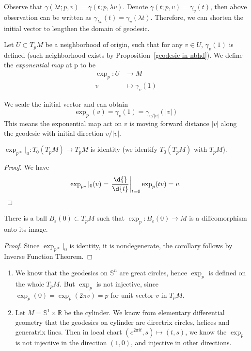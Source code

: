 Observe that $\gamma(\lambda t;p,v)=\gamma(t;p,\lambda v)$.
Denote $\gamma(t;p,v)=\gamma_v(t)$, then above observation can be written as $\gamma_{\lambda v}(t)=\gamma_v(\lambda t)$.
Therefore, we can shorten the initial vector to lengthen the domain of geodesic.

\begin{defn}
    Let $U\subset T_pM$ be a neighborhood of origin, such that for any $v\in U$, $\gamma_v(1)$ is defined (such neighborhood exists by Proposition~\ref{geodesic in nbhd}).
    We define the \emph{exponential map} at p to be
    \begin{align*}
        \exp_p:U&\to M\\
        v&\mapsto\gamma_v(1)
    \end{align*}
\end{defn}

\begin{rem}
    We scale the initial vector and can obtain
    \[\exp_p(v)=\gamma_v(1)=\gamma_{v/|v|}(|v|)\]
    This means the exponential map act on $v$ is moving forward distance $|v|$ along the geodesic with initial direction $v/|v|$.
\end{rem}

\begin{prop}
    $\exp_{p*}|_0:T_0(T_pM)\to T_pM$ is identity (we identify $T_0(T_pM)$ with $T_pM$).
\end{prop}
\begin{proof}
    We have
    \[\exp_{p*}|_0(v)=\left.\frac{\d{}}{\d{t}}\right|_{t=0}\exp_p(tv)=v.\qedhere\]
\end{proof}

\begin{cor}
    There is a ball $B_\varepsilon(0)\subset T_pM$ such that $\exp_p:B_\varepsilon(0)\to M$ is a diffeomorphism onto its image.
\end{cor}
\begin{proof}
    Since $\exp_{p*}|_0$ is identity, it is nondegenerate, the corollary follows by Inverse Function Theorem.
\end{proof}

\begin{eg}
    \begin{enumerate}[(1)]
        \item We know that the geodesics on $\mathbb{S}^n$ are great circles, hence $\exp_p$ is defined on the whole $T_pM$.
        But $\exp_p$ is not injective, since $\exp_p(0)=\exp_p(2\pi v)=p$ for unit vector $v$ in $T_pM$.
        \item Let $M=\mathbb{S}^1\times\mathbb{R}$ be the cylinder.
        We know from elementary differential geometry that the geodesics on cylinder are directrix circles, helices and generatrix lines.
        Then in local chart $(e^{2\pi it},s)\mapsto(t,s)$, we know the $\exp_p$ is not injective in the direction $(1,0)$, and injective in other directions.
    \end{enumerate}
\end{eg}

